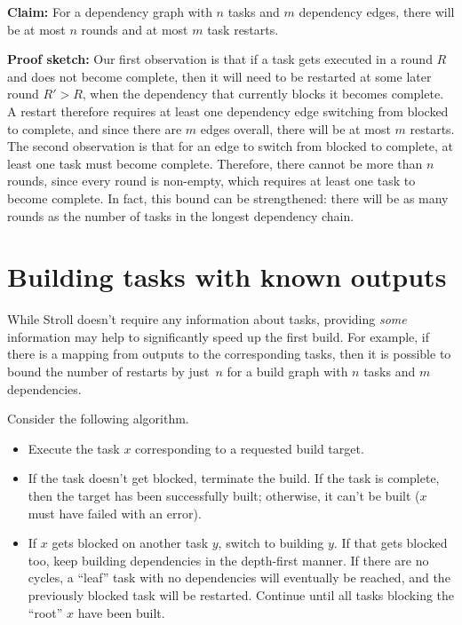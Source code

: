 \documentclass[sigconf]{acmart}
\begin{document}
\vspace{2mm}
\noindent
\textbf{Claim:} For a dependency graph with $n$ tasks and $m$ dependency edges,
there will be at most $n$ rounds and at most $m$ task restarts.

\vspace{2mm}
\noindent
\textbf{Proof sketch:} Our first observation is that if a task gets executed in
a round $R$ and does not become complete, then it will need to be restarted at
some later round $R' > R$, when the dependency that currently blocks it becomes
complete. A restart therefore requires at least one dependency edge switching
from blocked to complete, and since there are $m$ edges overall, there will be
at most $m$ restarts. The second observation is that for an edge to switch from
blocked to complete, at least one task must become complete. Therefore, there
cannot be more than $n$ rounds, since every round is non-empty, which requires
at least one task to become complete. In fact, this bound can be strengthened:
there will be as many rounds as the number of tasks in the longest dependency
chain.

\section{Building tasks with known outputs}

While Stroll doesn't require any information about tasks, providing \emph{some}
information may help to significantly speed up the first build. For example, if
there is a mapping from outputs to the corresponding tasks, then it is possible
to bound the number of restarts by just~$n$ for a build graph with $n$ tasks
and $m$ dependencies.

Consider the following algorithm.

\begin{itemize}
  \item Execute the task $x$ corresponding to a requested build target.

  \item If the task doesn't get blocked, terminate the build. If the task is
  complete, then the target has been successfully built; otherwise, it can't be
  built ($x$ must have failed with an error).

  \item If $x$ gets blocked on another task $y$, switch to building $y$. If that
  gets blocked too, keep building dependencies in the depth-first manner. If
  there are no cycles, a ``leaf'' task with no dependencies will eventually be
  reached, and the previously blocked task will be restarted. Continue until all
  tasks blocking the ``root'' $x$ have been built.
\end{itemize}
\end{document}
